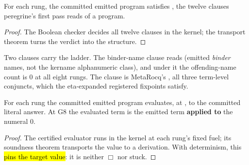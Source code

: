 \begin{lemma}\label{lem:Green-g1_wf}
 \leanok
{}
For each rung, the committed emitted program satisfies , the twelve clauses
peregrine's first pass reads of a \lbox{} program.
\end{lemma}

\begin{proof} \leanok
{}
 The Boolean checker decides all twelve clauses in the kernel; the transport theorem turns
the verdict into the structure.
\end{proof}

\begin{remark}
 Two clauses carry the ladder. The binder-name clause reads 
(emitted \emph{binder} names, not the kername alphanumeric class), and under it the offending-name
count is 0 at all eight rungs. The  clause is MetaRocq's , all
three term-level conjuncts, which the eta-expanded registered fixpoints satisfy.
\end{remark}

\begin{lemma}\label{lem:Green-g1_eval}
 \leanok
{}
For each rung the committed emitted program evaluates, at , to the committed literal
answer. At G8 the evaluated term is the emitted term \textbf{applied to} the numeral 0.
\end{lemma}

\begin{proof} \leanok
{}
 The certified evaluator runs in the kernel at each rung's fixed fuel; its soundness
theorem transports the value to a derivation. With determinism, this \hl{pins the target value}:
it is neither $\Box$ nor stuck.
\end{proof}

